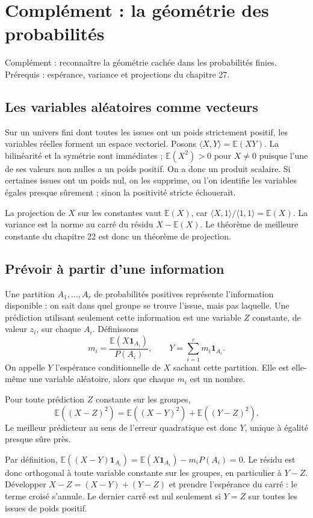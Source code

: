 \documentclass[../cours_1re.tex]{subfiles}
\begin{document}
\setcounter{chapter}{27}
\chapter{Complément : la géométrie des probabilités}
\label{ch:28}
\begin{objectif}
Complément : reconnaître la géométrie cachée dans les probabilités finies.
Prérequis : espérance, variance et projections du chapitre 27.
\end{objectif}
\section{Les variables aléatoires comme vecteurs}
Sur un univers fini dont toutes les issues ont un poids strictement positif,
les variables réelles forment un espace vectoriel. Posons
$\langle X,Y\rangle=\mathbb E(XY)$.
La bilinéarité et la symétrie sont immédiates ; $\mathbb E(X^2)>0$
pour $X\ne0$ puisque l'une de ses valeurs non nulles a un poids positif.
On a donc un produit scalaire.
Si certaines issues ont un poids nul, on les supprime, ou l'on identifie
les variables égales presque sûrement ; sinon la positivité stricte échouerait.

La projection de $X$ sur les constantes vaut $\mathbb E(X)$, car
$\langle X,1\rangle/\langle1,1\rangle=\mathbb E(X)$.
La variance est la norme au carré du résidu $X-\mathbb E(X)$.
Le théorème de meilleure constante du chapitre 22 est donc un théorème de projection.

\section{Prévoir à partir d'une information}
Une partition $A_1,\ldots,A_r$ de probabilités positives représente
l'information disponible : on sait dans quel groupe se trouve l'issue,
mais pas laquelle. Une prédiction utilisant seulement cette information
est une variable $Z$ constante, de valeur $z_i$, sur chaque $A_i$.
Définissons
\[
m_i=\frac{\mathbb E(X\mathbf1_{A_i})}{P(A_i)},\qquad
Y=\sum_{i=1}^r m_i\mathbf1_{A_i}.
\]
On appelle $Y$ l'espérance conditionnelle de $X$ sachant cette partition.
Elle est elle-même une variable aléatoire, alors que chaque $m_i$ est un nombre.

\begin{theoreme}
Pour toute prédiction $Z$ constante sur les groupes,
\[
\mathbb E((X-Z)^2)=\mathbb E((X-Y)^2)+\mathbb E((Y-Z)^2).
\]
Le meilleur prédicteur au sens de l'erreur quadratique est donc $Y$,
unique à égalité presque sûre près.
\end{theoreme}
\begin{demonstration}
Par définition,
$\mathbb E((X-Y)\mathbf1_{A_i})
=\mathbb E(X\mathbf1_{A_i})-m_iP(A_i)=0$.
Le résidu est donc orthogonal à toute variable constante sur les groupes,
en particulier à $Y-Z$.
Développer $X-Z=(X-Y)+(Y-Z)$ et prendre l'espérance du carré :
le terme croisé s'annule. Le dernier carré est nul seulement si $Y=Z$
sur toutes les issues de poids positif.
\end{demonstration}
\end{document}
